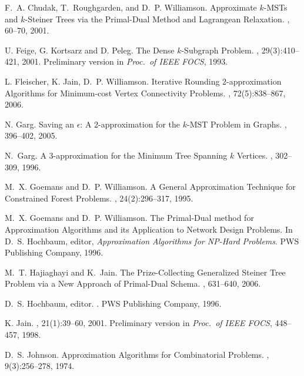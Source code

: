 \documentclass[11pt]{article}
\newcommand{\eps}{\epsilon}
\begin{document}
\begin{thebibliography}{99}
F.~A. Chudak, T.~Roughgarden, and D.~P. Williamson.
\newblock Approximate $k$-MSTs and $k$-Steiner Trees via the Primal-Dual
Method and Lagrangean Relaxation.
, 60--70, 2001.

U. Feige, G. Kortsarz and D. Peleg.
\newblock The Dense $k$-Subgraph Problem.
, 29(3):410--421, 2001.
\newblock Preliminary version in {\em Proc.\ of IEEE FOCS}, 1993.

L. Fleischer, K. Jain, D.~P. Williamson.
\newblock Iterative Rounding 2-approximation Algorithms for Minimum-cost Vertex
Connectivity Problems.
, 72(5):838--867, 2006.

N. Garg.
\newblock Saving an $\eps$: A $2$-approximation for the $k$-MST Problem in 
Graphs.
, 396--402, 2005.

N.~Garg.
\newblock A 3-approximation for the Minimum Tree Spanning $k$ Vertices.
, 302--309, 1996.

M.~X. Goemans and D.~P. Williamson.
\newblock A General Approximation Technique for Constrained Forest Problems.
, 24(2):296--317, 1995.

M.~X. Goemans and D.~P. Williamson.
\newblock The Primal-Dual method for Approximation Algorithms and its
  Application to Network Design Problems.
\newblock In D.~S. Hochbaum, editor, {\em Approximation Algorithms for NP-Hard
  Problems}. PWS Publishing Company, 1996.

M.~T. Hajiaghayi and K.~Jain.
\newblock The Prize-Collecting Generalized Steiner Tree Problem via a New
Approach of Primal-Dual Schema.
, 631--640, 2006.

D.~S. Hochbaum, editor.
.
\newblock PWS Publishing Company, 1996.

K. Jain.
, 21(1):39--60, 2001.
Preliminary version in {\em Proc.\ of IEEE FOCS}, 448--457, 1998.

D.~S. Johnson.
\newblock Approximation Algorithms for Combinatorial Problems.
, 9(3):256--278, 1974.


\end{thebibliography}
\end{document}
